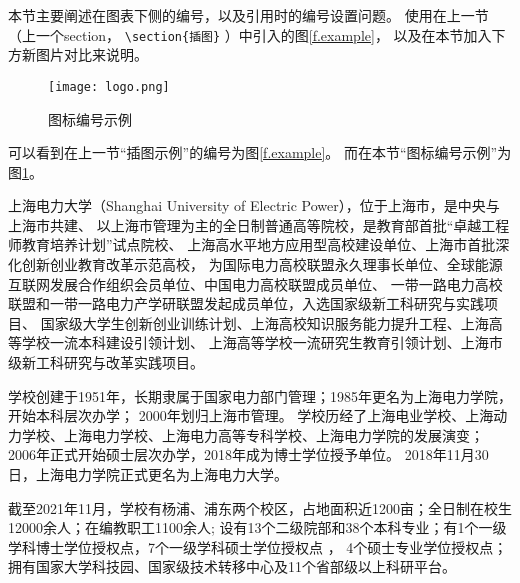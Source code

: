 本节主要阐述在图表下侧的编号，以及引用时的编号设置问题。
使用在上一节（上一个section， \verb|\section{插图}| ）中引入的图\ref{f.example}，
以及在本节加入下方新图片对比来说明。

\begin{figure}[hbt]
    \centering
    \texttt{[image: logo.png]}
    \caption{图标编号示例}
    \label{f.example.2}
\end{figure}

可以看到在上一节“插图示例”的编号为图\ref{f.example}。
而在本节“图标编号示例”为图\ref{f.example.2}。


上海电力大学（Shanghai University of Electric Power），位于上海市，是中央与上海市共建、
以上海市管理为主的全日制普通高等院校，是教育部首批“卓越工程师教育培养计划”试点院校、
上海高水平地方应用型高校建设单位、上海市首批深化创新创业教育改革示范高校，
为国际电力高校联盟永久理事长单位、全球能源互联网发展合作组织会员单位、中国电力高校联盟成员单位、
一带一路电力高校联盟和一带一路电力产学研联盟发起成员单位，入选国家级新工科研究与实践项目、
国家级大学生创新创业训练计划、上海高校知识服务能力提升工程、上海高等学校一流本科建设引领计划、
上海高等学校一流研究生教育引领计划、上海市级新工科研究与改革实践项目。

学校创建于1951年，长期隶属于国家电力部门管理；1985年更名为上海电力学院，开始本科层次办学；
2000年划归上海市管理。 学校历经了上海电业学校、上海动力学校、上海电力学校、上海电力高等专科学校、上海电力学院的发展演变；
2006年正式开始硕士层次办学，2018年成为博士学位授予单位。
2018年11月30日，上海电力学院正式更名为上海电力大学。

截至2021年11月，学校有杨浦、浦东两个校区，占地面积近1200亩；全日制在校生12000余人；在编教职工1100余人;
设有13个二级院部和38个本科专业；有1个一级学科博士学位授权点，7个一级学科硕士学位授权点 ，
4个硕士专业学位授权点；拥有国家大学科技园、国家级技术转移中心及11个省部级以上科研平台。 